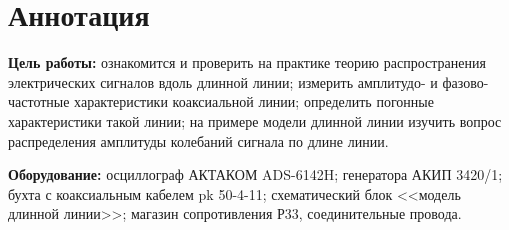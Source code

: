 \section{Аннотация}
\textbf{Цель работы:}  ознакомится и проверить на практике теорию распространения
электрических сигналов вдоль длинной линии; измерить амплитудо- и фазово-частотные
характеристики коаксиальной линии; определить погонные характеристики такой
линии; на примере модели длинной линии изучить вопрос распределения амплитуды
колебаний сигнала по длине линии.

\textbf{Оборудование:} осциллограф АКТАКОМ ADS-6142H; генератора АКИП 3420/1; бухта с
коаксиальным кабелем pk 50-4-11; схематический блок <<модель длинной линии>>; магазин
сопротивления Р33, соединительные провода.
